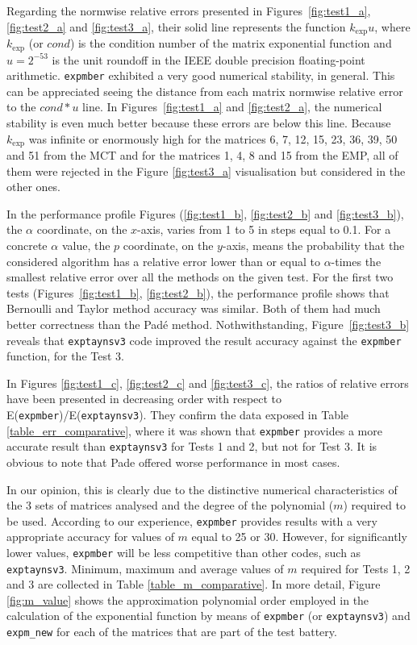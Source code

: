 Regarding the normwise relative errors presented in Figures~\ref{fig:test1_a}, \ref{fig:test2_a} and \ref{fig:test3_a}, their solid line represents the function ${k_{\exp}}u$, where ${k_{\exp}}$ (or $cond$) is the condition number of the matrix exponential function \cite[Chapter 3]{High08} and $u=2^{-53}$ is the unit roundoff in the IEEE double precision floating-point arithmetic. \texttt{expmber} exhibited a very good numerical stability, in general. This can be appreciated seeing the distance from each matrix normwise relative error to the $cond*u$ line. In Figures~\ref{fig:test1_a} and \ref{fig:test2_a}, the numerical stability is even much better because these errors are below this line. Because ${k_{\exp}}$ was infinite or enormously high for the matrices 6, 7, 12, 15, 23, 36, 39, 50 and 51 from the MCT and for the matrices 1, 4, 8 and 15 from the EMP, all of them were rejected in the Figure \ref{fig:test3_a} visualisation but considered in the other ones.

In the performance profile Figures (\ref{fig:test1_b}, \ref{fig:test2_b} and \ref{fig:test3_b}), the $\alpha$ coordinate, on the $x$-axis, varies from 1 to 5 in steps equal to 0.1. For a concrete $\alpha$ value, the $p$ coordinate,  on the $y$-axis,  means the probability that the considered algorithm has a relative error lower than or equal to $\alpha$-times the smallest relative error over all the methods on the given test. For the first two tests (Figures~\ref{fig:test1_b}, \ref{fig:test2_b}), the performance profile shows that Bernoulli and Taylor method accuracy was similar. Both of them had much better correctness than the Pad\'e method. Nothwithstanding, Figure~\ref{fig:test3_b} reveals that \texttt{exptaynsv3} code improved the result accuracy against the \texttt{expmber} function, for the Test 3. 

In Figures \ref{fig:test1_c}, \ref{fig:test2_c} and \ref{fig:test3_c}, the ratios of relative errors have been presented in decreasing order with respect to E(\texttt{expmber})/E(\texttt{exptaynsv3}). They confirm the data exposed in Table \ref{table_err_comparative}, where it was shown that \texttt{expmber} provides a more accurate result than \texttt{exptaynsv3} for Tests 1 and 2, but not for Test 3. It is obvious to note that Pade offered worse performance in most cases.

In our opinion, this is clearly due to the distinctive numerical characteristics of the 3 sets of matrices analysed and the degree of the polynomial ($m$) required to be used. According to our experience, \texttt{expmber} provides results with a very appropriate accuracy for values of $m$ equal to 25 or 30. However, for significantly lower values, \texttt{expmber} will be less competitive than other codes, such as \texttt{exptaynsv3}. Minimum, maximum and average values of $m$ required for Tests 1, 2 and 3 are collected in Table \ref{table_m_comparative}. In more detail, Figure \ref{fig:m_value} shows the approximation polynomial order employed in the calculation of the exponential function by means of \texttt{expmber} (or \texttt{exptaynsv3}) and \texttt{expm\_new} for each of the matrices that are part of the test battery.

